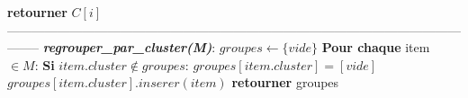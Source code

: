\documentclass[11pt]{article}
\begin{document}
\begin{algorithm}
\begin{algorithmic}[1]
        \State \hspace{0.5cm} \textbf{retourner} $C[i]$
        \\
--------------------------------------------------------------------------------------------------------------------
		\State \textbf{\textit{regrouper\_par\_cluster(M)}}:
		\State \hspace{0.5cm} $groupes \leftarrow \{vide\}$
		\State \hspace{0.5cm} \textbf{Pour chaque} item $\in M$:
		\State \hspace{1cm} \textbf{Si} $item.cluster \notin groupes$:
		\State \hspace{1.5cm} $groupes[item.cluster] = [vide]$
		\State \hspace{1cm} $groupes[item.cluster].inserer(item)$
		\State \hspace{0.5cm} \textbf{retourner} groupes 
		
    \end{algorithmic}
\end{algorithm}
\end{document}
